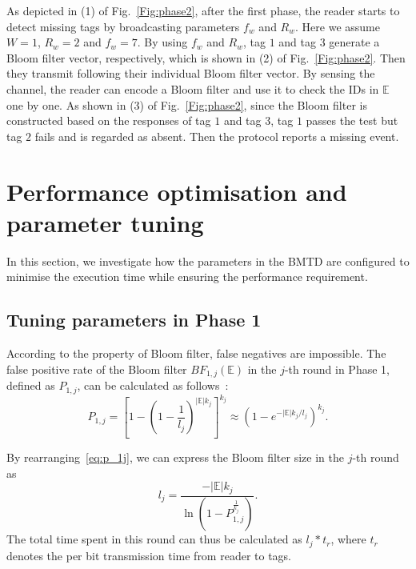 \documentclass[10pt, twocolumn]{IEEEtran}
\begin{document}
As depicted in (1) of Fig.~\ref{Fig:phase2}, after the first phase, the reader starts to detect missing tags by broadcasting parameters $f_w$ and $R_w$. Here we assume $W=1$, $R_w=2$ and $f_w=7$. By using $f_w$ and $R_w$, tag $1$ and tag $3$ generate a Bloom filter vector, respectively, which is shown in (2) of Fig.~\ref{Fig:phase2}. Then they transmit following their individual Bloom filter vector. By sensing the channel, the reader can encode a Bloom filter and use it to check the IDs in $\mathbb{E}$ one by one. As shown in (3) of Fig.~\ref{Fig:phase2}, since the Bloom filter is constructed based on the responses of tag $1$ and tag $3$, tag $1$ passes the test but tag $2$ fails and is regarded as absent. Then the protocol reports a missing event.

\section{Performance optimisation and parameter tuning}
\label{sec:parameter}

In this section, we investigate how the parameters in the BMTD are configured to minimise the execution time while ensuring the performance requirement.

\subsection{Tuning parameters in Phase 1}

According to the property of Bloom filter, false negatives are impossible. The false positive rate of the Bloom filter $BF_{1,j} (\mathbb{E})$ in the $j$-th round in Phase 1, defined as $P_{1,j}$, can be calculated as follows~\cite{bloom1970space}:
\begin{equation}
P_{1,j} = \left[1-\left(1-\frac{1}{l_j}\right)^{|\mathbb{E}| k_j}\right]^{k_j} \approx (1-e^{-{|\mathbb{E}| k_j}/l_j})^{k_j}.
\label{eq:p_1j}
\end{equation}

By rearranging~\eqref{eq:p_1j}, we can express the Bloom filter size in the $j$-th round as
\begin{equation}
l_j = \frac{-|\mathbb{E}| k_j}{\ln (1- P^{\frac{1}{k_j}}_{1,j})}.
\end{equation}
The total time spent in this round can thus be calculated as $l_j * t_r$, where $t_r$ denotes the per bit transmission time from reader to tags.
\end{document}
